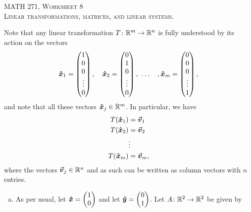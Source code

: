 \documentclass[12pt]{article} %
\begin{document}
\begin{center}
   \textsc{\large MATH 271, Worksheet 8}\\
   \textsc{Linear transformations, matrices, and linear systems.}
\end{center}
\vspace{.5cm}

\begin{problem}
    Note that any linear transformation $T\colon \mathbb{R}^m \to \mathbb{R}^n$ is fully understood by its action on the vectors
    \[
        \boldsymbol{\hat{x}}_1 = \begin{pmatrix} 1 \\ 0 \\ 0 \\ \vdots \\ 0 \end{pmatrix}, \quad \boldsymbol{\hat{x}}_2 = \begin{pmatrix} 0 \\ 1 \\ 0 \\ \vdots \\ 0 \end{pmatrix}, ~\dots \quad, \boldsymbol{\hat{x}}_m = \begin{pmatrix} 0 \\ 0 \\ 0 \\ \vdots \\ 1 \end{pmatrix},
    \]
    and note that all these vectors $\boldsymbol{\hat{x}}_j \in \mathbb{R}^m$. In particular, we have
    \begin{align*}
        T(\boldsymbol{\hat{x}}_1) &= \boldsymbol{\boldsymbol{\vec{v}}}_1\\
        T(\boldsymbol{\hat{x}}_2) &= \boldsymbol{\boldsymbol{\vec{v}}}_2\\
                    & \vdots\\
        T(\boldsymbol{\hat{x}}_m) &= \boldsymbol{\boldsymbol{\vec{v}}}_m,\\
    \end{align*}
    where the vectors $\boldsymbol{\boldsymbol{\vec{v}}}_j \in \mathbb{R}^n$ and as such can be written as column vectors with $n$ entries.
    \begin{enumerate}[(a)]
        \item As per usual, let $\boldsymbol{\hat{x}} = \begin{pmatrix} 1 \\ 0 \end{pmatrix}$ and let $\boldsymbol{\hat{y}} = \begin{pmatrix} 0 \\ 1 \end{pmatrix}$. Let $A \colon \mathbb{R}^2 \to \mathbb{R}^2$ be given by
        \[
\]
\end{enumerate}
\end{problem}
\end{document}
